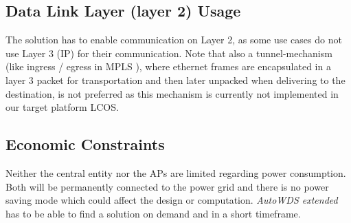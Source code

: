     \subsection{Data Link Layer (layer 2) Usage}
      The solution has to enable communication on Layer 2, as some use cases do not use Layer 3 (\ac{IP}) for their communication.
      Note that also a tunnel-mechanism (like ingress / egress in \ac{MPLS} \cite{mpls}), 
      where ethernet frames are encapsulated in a layer 3 packet for transportation and then later unpacked when delivering to the destination,
      is not preferred as this mechanism is currently not implemented in our target platform \ac{LCOS}.
    
    \subsection{Economic Constraints}
      Neither the central entity nor the APs are limited regarding power consumption. 
      Both will be permanently connected to the power grid and there is no power saving mode which could affect the design or computation.
      \textit{AutoWDS extended} has to be able to find a solution on demand and in a short timeframe.
  